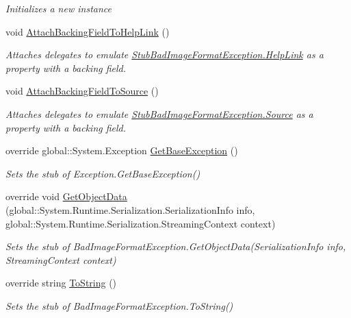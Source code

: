 \begin{DoxyCompactItemize}
\begin{DoxyCompactList}\small\item\em Initializes a new instance\end{DoxyCompactList}\item 
void \hyperlink{class_system_1_1_fakes_1_1_stub_bad_image_format_exception_ade168dc4b41f32f924a9e63a8172b1b5}{Attach\-Backing\-Field\-To\-Help\-Link} ()
\begin{DoxyCompactList}\small\item\em Attaches delegates to emulate \hyperlink{class_system_1_1_fakes_1_1_stub_bad_image_format_exception_adb62e400184a627636ae5097ef511038}{Stub\-Bad\-Image\-Format\-Exception.\-Help\-Link} as a property with a backing field.\end{DoxyCompactList}\item 
void \hyperlink{class_system_1_1_fakes_1_1_stub_bad_image_format_exception_abbd6d3ab990d479c02c8a11883eaa657}{Attach\-Backing\-Field\-To\-Source} ()
\begin{DoxyCompactList}\small\item\em Attaches delegates to emulate \hyperlink{class_system_1_1_fakes_1_1_stub_bad_image_format_exception_a42d0f502aa004a55deeac8b57a895e40}{Stub\-Bad\-Image\-Format\-Exception.\-Source} as a property with a backing field.\end{DoxyCompactList}\item 
override global\-::\-System.\-Exception \hyperlink{class_system_1_1_fakes_1_1_stub_bad_image_format_exception_a803672112f3221b75ec373b5ece8b113}{Get\-Base\-Exception} ()
\begin{DoxyCompactList}\small\item\em Sets the stub of Exception.\-Get\-Base\-Exception()\end{DoxyCompactList}\item 
override void \hyperlink{class_system_1_1_fakes_1_1_stub_bad_image_format_exception_aea1bd7122dad2698df0707d2b9a0de30}{Get\-Object\-Data} (global\-::\-System.\-Runtime.\-Serialization.\-Serialization\-Info info, global\-::\-System.\-Runtime.\-Serialization.\-Streaming\-Context context)
\begin{DoxyCompactList}\small\item\em Sets the stub of Bad\-Image\-Format\-Exception.\-Get\-Object\-Data(\-Serialization\-Info info, Streaming\-Context context)\end{DoxyCompactList}\item 
override string \hyperlink{class_system_1_1_fakes_1_1_stub_bad_image_format_exception_a76c84f568ff781649464064f49b750e3}{To\-String} ()
\begin{DoxyCompactList}\small\item\em Sets the stub of Bad\-Image\-Format\-Exception.\-To\-String()\end{DoxyCompactList}\end{DoxyCompactItemize}
